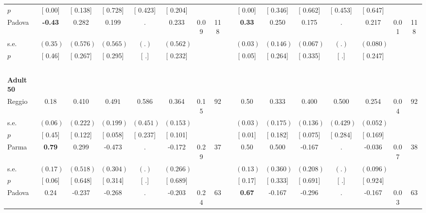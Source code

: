 \begin{longtable}{L{8em} c c c c c c c p{1em} c c c c c c c}
\quad \quad \quad \quad $ p$ & [     0.00] & [    0.138] & [    0.728] & [    0.423] & [    0.204] & & & & [     0.00] & [    0.346] & [    0.662] & [    0.453] & [    0.647] & &  \\[1em]
\quad \quad \quad Padova& \textbf{    -0.43} &     0.282 &     0.199 &         . &     0.233 &      0.09 &       118 & & \textbf{     0.33} &     0.250 &     0.175 &         . &     0.217 &      0.01 &       118  \\*
\quad \quad \quad \quad s.e.& $ (     0.35)$ & $ (    0.576)$ & $ (    0.565)$ & $ (        .)$ & $ (    0.562)$ & & & & $ (     0.03)$ & $ (    0.146)$ & $ (    0.067)$ & $ (        .)$ & $ (    0.080)$ & &  \\*
\quad \quad \quad \quad $ p$ & [     0.46] & [    0.267] & [    0.295] & [        .] & [    0.232] & & & & [     0.05] & [    0.264] & [    0.335] & [        .] & [    0.247] & &  \\[1em]
~\\[1em]
\quad \quad \textbf{Adult 50} & & & & & & & & & & & & & & & \\* 
\quad \quad \quad Reggio& 0.18 &     0.410 & $ \mathbf{    0.491}$ &     0.586 &     0.364 &      0.15 &        92 & & 0.50 &     0.333 & $ \mathbf{    0.400}$ &     0.500 &     0.254 &      0.04 &        92  \\*
\quad \quad \quad \quad s.e.& $ (     0.06)$ & $ (    0.222)$ & $ (    0.199)$ & $ (    0.451)$ & $ (    0.153)$ & & & & $ (     0.03)$ & $ (    0.175)$ & $ (    0.136)$ & $ (    0.429)$ & $ (    0.052)$ & &  \\*
\quad \quad \quad \quad $ p$ & [     0.45] & [    0.122] & [    0.058] & [    0.237] & [    0.101] & & & & [     0.01] & [    0.182] & [    0.075] & [    0.284] & [    0.169] & &  \\[1em]
\quad \quad \quad Parma& \textbf{     0.79} &     0.299 &    -0.473 &         . &    -0.172 &      0.29 &        37 & & 0.50 &     0.500 &    -0.167 &         . &    -0.036 &      0.07 &        38  \\*
\quad \quad \quad \quad s.e.& $ (     0.17)$ & $ (    0.518)$ & $ (    0.304)$ & $ (        .)$ & $ (    0.266)$ & & & & $ (     0.13)$ & $ (    0.360)$ & $ (    0.208)$ & $ (        .)$ & $ (    0.096)$ & &  \\*
\quad \quad \quad \quad $ p$ & [     0.06] & [    0.648] & [    0.314] & [        .] & [    0.689] & & & & [     0.17] & [    0.333] & [    0.691] & [        .] & [    0.924] & &  \\[1em]
\quad \quad \quad Padova& 0.24 &    -0.237 &    -0.268 &         . &    -0.203 &      0.24 &        63 & & \textbf{     0.67} &    -0.167 &    -0.296 &         . &    -0.167 &      0.03 &        63  \\*

\end{longtable}
